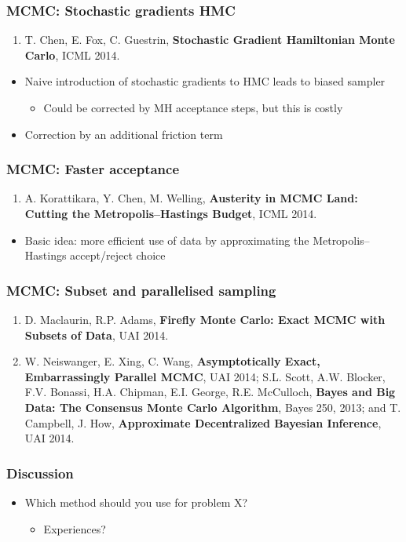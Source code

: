 \documentclass{beamer}
\begin{document}
\begin{frame}
  \frametitle{MCMC: Stochastic gradients HMC}

  \begin{enumerate}
  \item T. Chen, E. Fox, C. Guestrin, \textbf{Stochastic Gradient Hamiltonian Monte Carlo}, ICML 2014.
  \end{enumerate}
  
  \begin{itemize}
  \item Naive introduction of stochastic gradients to HMC leads to
    biased sampler
    \begin{itemize}
    \item Could be corrected by MH acceptance steps, but this is costly
    \end{itemize}
  \item Correction by an additional friction term
  \end{itemize}
\end{frame}


\begin{frame}
  \frametitle{MCMC: Faster acceptance}

  \begin{enumerate}
  \item A. Korattikara, Y. Chen, M. Welling, \textbf{Austerity in MCMC Land: Cutting the Metropolis--Hastings Budget}, ICML 2014.
  \end{enumerate}

  \begin{itemize}
  \item Basic idea: more efficient use of data by approximating the
    Metropolis--Hastings accept/reject choice
  \end{itemize}
\end{frame}

\begin{frame}
  \frametitle{MCMC: Subset and parallelised sampling}

  \begin{enumerate}
  \item D. Maclaurin, R.P. Adams, \textbf{Firefly Monte Carlo: Exact MCMC with Subsets of Data}, UAI 2014.
  \item W. Neiswanger, E. Xing, C. Wang, \textbf{Asymptotically Exact, Embarrassingly Parallel MCMC}, UAI 2014; S.L. Scott, A.W. Blocker, F.V. Bonassi, H.A. Chipman, E.I. George, R.E. McCulloch, \textbf{Bayes and Big Data: The Consensus Monte Carlo Algorithm}, Bayes 250, 2013; and T. Campbell, J. How, \textbf{Approximate Decentralized Bayesian Inference}, UAI 2014. 
  \end{enumerate}
\end{frame}


\begin{frame}
  \frametitle{Discussion}

  \begin{itemize}
  \item Which method should you use for problem X?
    \begin{itemize}
    \item Experiences?
    \end{itemize}
  \end{itemize}
\end{frame}
\end{document}
